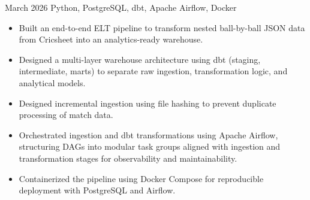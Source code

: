 

  {March 2026}
  {Python, PostgreSQL, dbt, Apache Airflow, Docker}
  \begin{itemize}
    \item Built an end-to-end ELT pipeline to transform nested ball-by-ball JSON data from Cricsheet into an analytics-ready warehouse.
    \item Designed a multi-layer warehouse architecture using dbt (staging, intermediate, marts)
      to separate raw ingestion, transformation logic, and analytical models.
    \item Designed incremental ingestion using file hashing to prevent duplicate processing of match data.
    \item Orchestrated ingestion and dbt transformations using Apache Airflow,
      structuring DAGs into modular task groups aligned with ingestion and transformation stages for observability and maintainability.
    \item Containerized the pipeline using Docker Compose for reproducible deployment with PostgreSQL and Airflow.

  \end{itemize}
